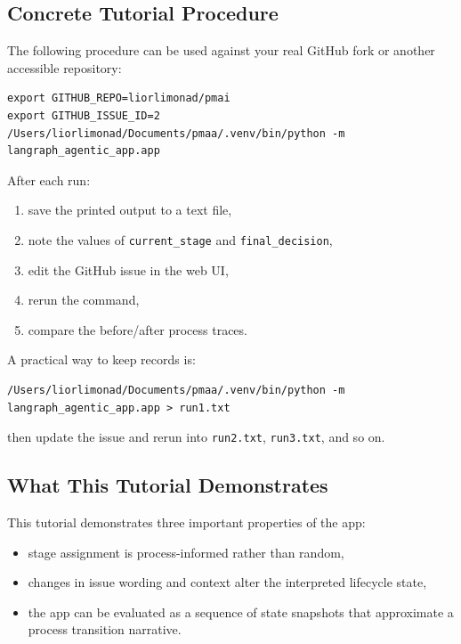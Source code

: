 \documentclass[11pt,a4paper]{article}
\begin{document}
\subsection{Concrete Tutorial Procedure}

The following procedure can be used against your real GitHub fork or another accessible repository:

\begin{lstlisting}[style=bashstyle]
export GITHUB_REPO=liorlimonad/pmai
export GITHUB_ISSUE_ID=2
/Users/liorlimonad/Documents/pmaa/.venv/bin/python -m langraph_agentic_app.app
\end{lstlisting}

After each run:
\begin{enumerate}
    \item save the printed output to a text file,
    \item note the values of \texttt{current\_stage} and \texttt{final\_decision},
    \item edit the GitHub issue in the web UI,
    \item rerun the command,
    \item compare the before/after process traces.
\end{enumerate}

A practical way to keep records is:

\begin{lstlisting}[style=bashstyle]
/Users/liorlimonad/Documents/pmaa/.venv/bin/python -m langraph_agentic_app.app > run1.txt
\end{lstlisting}

then update the issue and rerun into \texttt{run2.txt}, \texttt{run3.txt}, and so on.

\subsection{What This Tutorial Demonstrates}

This tutorial demonstrates three important properties of the app:
\begin{itemize}
    \item stage assignment is process-informed rather than random,
    \item changes in issue wording and context alter the interpreted lifecycle state,
    \item the app can be evaluated as a sequence of state snapshots that approximate a process transition narrative.
\end{itemize}
\end{document}
